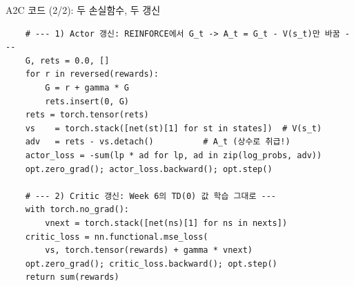 \begin{frame}[fragile]{A2C 코드 (2/2): 두 손실함수, 두 갱신}
\begin{lstlisting}
    # --- 1) Actor 갱신: REINFORCE에서 G_t -> A_t = G_t - V(s_t)만 바꿈 ---
    G, rets = 0.0, []
    for r in reversed(rewards):
        G = r + gamma * G
        rets.insert(0, G)
    rets = torch.tensor(rets)
    vs    = torch.stack([net(st)[1] for st in states])  # V(s_t)
    adv   = rets - vs.detach()          # A_t (상수로 취급!)
    actor_loss = -sum(lp * ad for lp, ad in zip(log_probs, adv))
    opt.zero_grad(); actor_loss.backward(); opt.step()

    # --- 2) Critic 갱신: Week 6의 TD(0) 값 학습 그대로 ---
    with torch.no_grad():
        vnext = torch.stack([net(ns)[1] for ns in nexts])
    critic_loss = nn.functional.mse_loss(
        vs, torch.tensor(rewards) + gamma * vnext)
    opt.zero_grad(); critic_loss.backward(); opt.step()
    return sum(rewards)
\end{lstlisting}
\end{frame}

